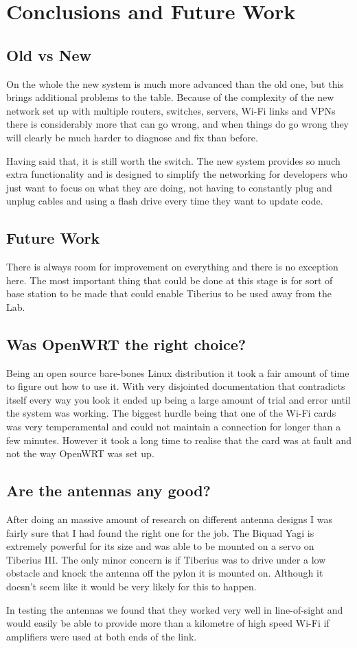 \section{Conclusions and Future Work}
\subsection{Old vs New}
On the whole the new system is much more advanced than the old one, but this brings additional problems to the table. Because of the complexity of the new network set up with multiple routers, switches, servers, Wi-Fi links and VPNs there is considerably more that can go wrong, and when things do go wrong they will clearly be much harder to diagnose and fix than before.

Having said that, it is still worth the switch. The new system provides so much extra functionality and is designed to simplify the networking for developers who just want to focus on what they are doing, not having to constantly plug and unplug cables and using a flash drive every time they want to update code. 

\subsection{Future Work}
There is always room for improvement on everything and there is no exception here. The most important thing that could be done at this stage is for sort of base station to be made that could enable Tiberius to be used away from the Lab. 

\subsection{Was OpenWRT the right choice?}
Being an open source bare-bones Linux distribution it took a fair amount of time to figure out how to use it. With very disjointed documentation that contradicts itself every way you look it ended up being a large amount of trial and error until the system was working. The biggest hurdle being that one of the Wi-Fi cards was very temperamental and could not maintain a connection for longer than a few minutes. However it took a long time to realise that the card was at fault and not the way OpenWRT was set up.

\subsection{Are the antennas any good?}
After doing an massive amount of research on different antenna designs I was fairly sure that I had found the right one for the job. The Biquad Yagi is extremely powerful for its size and was able to be mounted on a servo on Tiberius III. The only minor concern is if Tiberius was to drive under a low obstacle and knock the antenna off the pylon it is mounted on. Although it doesn't seem like it would be very likely for this to happen.

In testing the antennas we found that they worked very well in line-of-sight and would easily be able to provide more than a kilometre of high speed Wi-Fi if amplifiers were used at both ends of the link.

